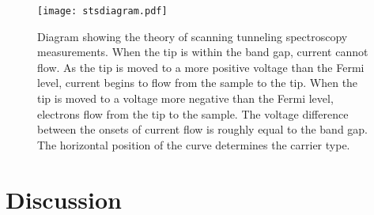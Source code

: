 \begin{figure}
	\centerline{\texttt{[image: stsdiagram.pdf]}}
		\caption[Theory of scanning tunneling spectroscopy measurements]{%
			Diagram showing the theory of scanning tunneling spectroscopy 
			measurements. When the tip is within the band gap, current cannot
			 flow. As the tip is moved to a more positive voltage than the 
			 Fermi level, current begins to flow from the sample to the tip. 
			 When the tip is moved to a voltage more negative than the Fermi 
			 level, electrons flow from the tip to the sample. The voltage 
			 difference between the onsets of current flow is roughly equal 
			 to the band gap. The horizontal position of the curve determines 
			 the carrier type.}
	\label{fig:stsdiagram}
\end{figure}

\section{Discussion}\label{sec:ch7discussion}

